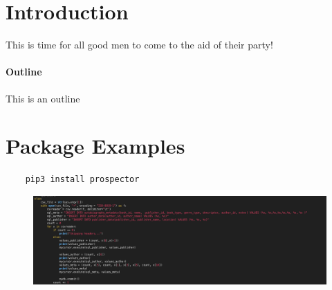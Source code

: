 \documentclass[12pt]{article}
\begin{document}
    \maketitle

    \section{Introduction}
    This is time for all good men to come to the aid of their party!

    \paragraph{Outline \\}
    This is an outline 
    \section{Package Examples}
    \begin{lstlisting}
    pip3 install prospector
    \end{lstlisting}
    \graphicspath{{.}}
    \begin{figure}[h]
        \includegraphics[width=\textwidth]{image}
    \end{figure}


    
\end{document}
